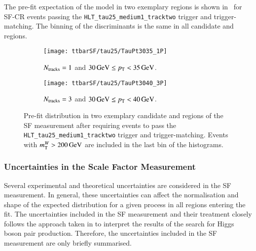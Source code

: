 The pre-fit expectation of the model in two exemplary regions is shown
in~ for SF-CR events passing the
\verb|HLT_tau25_medium1_tracktwo| trigger and trigger-matching. The binning of
the \mTW discriminants is the same in all \tauhadvis candidate \pT and \Ntracks
regions.

\begin{figure}[htbp]
  \centering

  \begin{subfigure}{.48\textwidth}
    \texttt{[image: ttbarSF/tau25/TauPt3035\_1P]}
    \caption{$N_{\text{tracks}} = 1$ and $\SI{30}{\ensuremath{\text{GeV}}} \leq p_{\text{T}} < \SI{35}{\ensuremath{\text{GeV}}}$.}
  \end{subfigure}\hfill%
  \begin{subfigure}{.48\textwidth}
    \texttt{[image: ttbarSF/tau25/TauPt3040\_3P]}
    \caption{$N_{\text{tracks}} = 3$ and $\SI{30}{\GeV} \leq \pT < \SI{40}{\GeV}$.}
  \end{subfigure}

  \caption[Pre-fit \mTW distribution in two exemplary regions of the SF
  measurement.]{Pre-fit \mTW distribution in two exemplary \tauhadvis candidate
    \Ntracks and \pT regions of the SF measurement after requiring events to
    pass the \texttt{HLT\_tau25\_medium1\_tracktwo} trigger and
    trigger-matching. Events with $m_{\text{T}}^W > \SI{200}{\ensuremath{\text{GeV}}}$ are included in the
    last bin of the histograms.}%
  \label{fig:ttbarsf_mtw_examples_prefit}
\end{figure}


\subsubsection{Uncertainties in the Scale Factor Measurement}

Several experimental and theoretical uncertainties are considered in the SF
measurement. In general, these uncertainties can affect the normalisation and
shape of the expected \mTW distribution for a given process in all regions
entering the fit. The uncertainties included in the SF measurement and their
treatment closely follows the approach taken in
 to interpret the results of
the search for Higgs boson pair production. Therefore, the uncertainties
included in the SF measurement are only briefly summarised.

